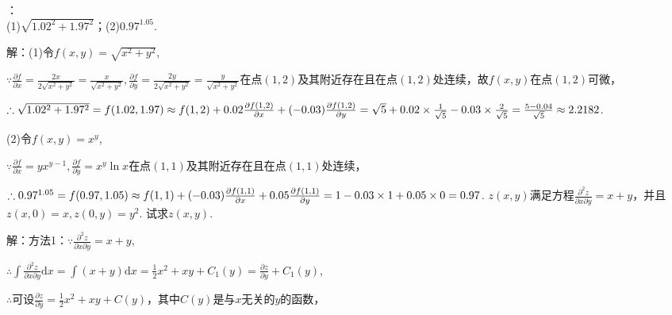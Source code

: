 \documentclass[12pt,UTF8]{ctexart}
\newcommand{\Int}[4]{\int_{#1}^{#2}#3\mathrm d#4}
\begin{document}
\begin{enumerate}
：\\
(1)$\sqrt{1.02^2+1.97^2}$；\quad\quad(2)$0.97^{1.05}$.

解：(1)令$f(x,y)=\sqrt{x^2+y^2}$,

$\because\frac{\partial f}{\partial x}=\frac{2x}{2\sqrt{x^2+y^2}}=\frac x{\sqrt{x^2+y^2}},\frac{\partial f}{\partial y}=\frac{2y}{2\sqrt{x^2+y^2}}=\frac y{\sqrt{x^2+y^2}}$在点$(1,2)$及其附近存在且在点$(1,2)$处连续，故$f(x,y)$在点$(1,2)$可微，

$\therefore\sqrt{1.02^2+1.97^2}=f(1.02,1.97)\approx f(1,2)+0.02\frac{\partial f(1,2)}{\partial x}+(-0.03)\frac{\partial f(1,2)}{\partial y}\\
=\sqrt5+0.02\times\frac1{\sqrt5}-0.03\times\frac2{\sqrt5}=\frac{5-0.04}{\sqrt5}\approx2.2182$.

(2)令$f(x,y)=x^y$,

$\because\frac{\partial f}{\partial x}=yx^{y-1},\frac{\partial f}{\partial y}=x^y\ln x$在点$(1,1)$及其附近存在且在点$(1,1)$处连续，

$\therefore0.97^{1.05}=f(0.97,1.05)\approx f(1,1)+(-0.03)\frac{\partial f(1,1)}{\partial x}+0.05\frac{\partial f(1,1)}{\partial y}\\
=1-0.03\times1+0.05\times0=0.97$.
$z(x,y)$满足方程$\frac{\partial^2z}{\partial x\partial y}=x+y$，并且$z(x,0)=x,z(0,y)=y^2$. 试求$z(x,y)$.

解：方法1：$\because\frac{\partial^2z}{\partial x\partial y}=x+y$,

$\therefore\int\frac{\partial^2z}{\partial x\partial y}\mathrm dx=\int(x+y)\mathrm dx=\frac12x^2+xy+C_1(y)=\frac{\partial z}{\partial y}+C_1(y)$,

$\therefore$可设$\frac{\partial z}{\partial y}=\frac12x^2+xy+C(y)$，其中$C(y)$是与$x$无关的$y$的函数，


\end{enumerate}
\end{document}

